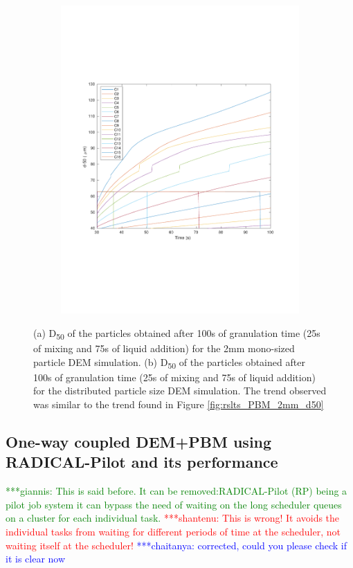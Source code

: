 \documentclass[preprint,11pt,authoryear]{elsarticle}
\newcommand{\jhanote}[1]{ {\textcolor{red} { ***shantenu: #1 }}}
\newcommand{\csnote}[1]{ {\textcolor{blue} { ***chaitanya: #1 }}}
\newcommand{\gpnote}[1]{{\textcolor{green} {***giannis: #1}}}
\newcommand{\jhanote}[1]{}
\newcommand{\csnote}[1]{}
\newcommand{\gpnote}[1]{}
\begin{document}
\begin{figure}
\begin{subfigure}{.45\textwidth}
\includegraphics[scale=0.5]{rslts_pbm_d50_128_555.pdf}
\caption{}
\label{fig:rslts_PBM_psd_d50}
\end{subfigure}
\caption{(a) D\textsubscript{50} of the particles obtained after 100s of granulation time (25s of 
mixing and 75s of liquid addition) for the 2mm mono-sized particle DEM simulation. (b) D\textsubscript{50} of the particles obtained after 100s of granulation time (25s of mixing and 75s of liquid addition) for the distributed particle size DEM simulation. The trend observed was similar to the trend 
found in Figure \ref{fig:rslts_PBM_2mm_d50}}
\end{figure}  


\subsection{One-way coupled DEM+PBM using RADICAL-Pilot and its performance} 

\gpnote{This is said before. It can be removed:RADICAL-Pilot (RP) being a pilot job system it can bypass the need of
waiting on the long scheduler queues on a cluster for each individual task.} \jhanote{This is wrong! It
avoids the individual tasks from waiting for different periods of time at the
scheduler, not waiting itself at the scheduler!} \csnote{corrected, could you please check if it is clear now} 
\end{document}
